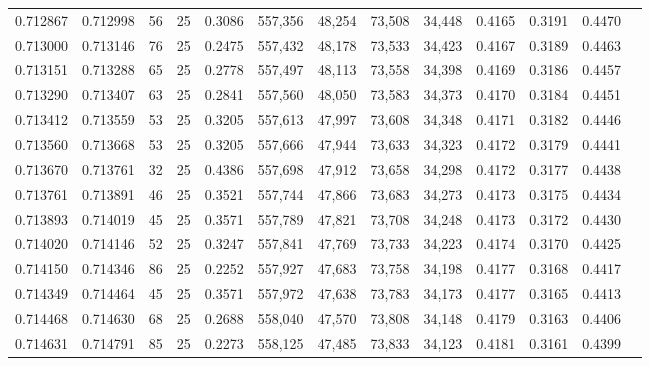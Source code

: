\begin{tabular}{rrrrrrrrrrrrr}
0.712867 & 0.712998 &    56 &  25 &                                     0.3086 & 557,356 &  48,254 &  73,508 &  34,448 & 0.4165 & 0.3191 & 0.4470 \\
0.713000 & 0.713146 &    76 &  25 &                                     0.2475 & 557,432 &  48,178 &  73,533 &  34,423 & 0.4167 & 0.3189 & 0.4463 \\
0.713151 & 0.713288 &    65 &  25 &                                     0.2778 & 557,497 &  48,113 &  73,558 &  34,398 & 0.4169 & 0.3186 & 0.4457 \\
0.713290 & 0.713407 &    63 &  25 &                                     0.2841 & 557,560 &  48,050 &  73,583 &  34,373 & 0.4170 & 0.3184 & 0.4451 \\
0.713412 & 0.713559 &    53 &  25 &                                     0.3205 & 557,613 &  47,997 &  73,608 &  34,348 & 0.4171 & 0.3182 & 0.4446 \\
0.713560 & 0.713668 &    53 &  25 &                                     0.3205 & 557,666 &  47,944 &  73,633 &  34,323 & 0.4172 & 0.3179 & 0.4441 \\
0.713670 & 0.713761 &    32 &  25 &                                     0.4386 & 557,698 &  47,912 &  73,658 &  34,298 & 0.4172 & 0.3177 & 0.4438 \\
0.713761 & 0.713891 &    46 &  25 &                                     0.3521 & 557,744 &  47,866 &  73,683 &  34,273 & 0.4173 & 0.3175 & 0.4434 \\
0.713893 & 0.714019 &    45 &  25 &                                     0.3571 & 557,789 &  47,821 &  73,708 &  34,248 & 0.4173 & 0.3172 & 0.4430 \\
0.714020 & 0.714146 &    52 &  25 &                                     0.3247 & 557,841 &  47,769 &  73,733 &  34,223 & 0.4174 & 0.3170 & 0.4425 \\
0.714150 & 0.714346 &    86 &  25 &                                     0.2252 & 557,927 &  47,683 &  73,758 &  34,198 & 0.4177 & 0.3168 & 0.4417 \\
0.714349 & 0.714464 &    45 &  25 &                                     0.3571 & 557,972 &  47,638 &  73,783 &  34,173 & 0.4177 & 0.3165 & 0.4413 \\
0.714468 & 0.714630 &    68 &  25 &                                     0.2688 & 558,040 &  47,570 &  73,808 &  34,148 & 0.4179 & 0.3163 & 0.4406 \\
0.714631 & 0.714791 &    85 &  25 &                                     0.2273 & 558,125 &  47,485 &  73,833 &  34,123 & 0.4181 & 0.3161 & 0.4399 \\

\end{tabular}
